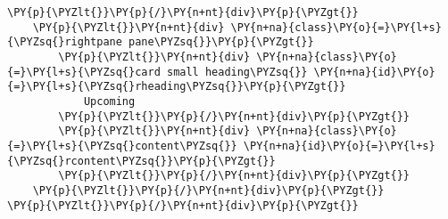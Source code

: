 \begin{Verbatim}[commandchars=\\\{\}]
    \PY{p}{\PYZlt{}}\PY{p}{/}\PY{n+nt}{div}\PY{p}{\PYZgt{}}
    \PY{p}{\PYZlt{}}\PY{n+nt}{div} \PY{n+na}{class}\PY{o}{=}\PY{l+s}{\PYZsq{}rightpane pane\PYZsq{}}\PY{p}{\PYZgt{}}
        \PY{p}{\PYZlt{}}\PY{n+nt}{div} \PY{n+na}{class}\PY{o}{=}\PY{l+s}{\PYZsq{}card small heading\PYZsq{}} \PY{n+na}{id}\PY{o}{=}\PY{l+s}{\PYZsq{}rheading\PYZsq{}}\PY{p}{\PYZgt{}}
            Upcoming
        \PY{p}{\PYZlt{}}\PY{p}{/}\PY{n+nt}{div}\PY{p}{\PYZgt{}}
        \PY{p}{\PYZlt{}}\PY{n+nt}{div} \PY{n+na}{class}\PY{o}{=}\PY{l+s}{\PYZsq{}content\PYZsq{}} \PY{n+na}{id}\PY{o}{=}\PY{l+s}{\PYZsq{}rcontent\PYZsq{}}\PY{p}{\PYZgt{}}
        \PY{p}{\PYZlt{}}\PY{p}{/}\PY{n+nt}{div}\PY{p}{\PYZgt{}}
    \PY{p}{\PYZlt{}}\PY{p}{/}\PY{n+nt}{div}\PY{p}{\PYZgt{}}
\PY{p}{\PYZlt{}}\PY{p}{/}\PY{n+nt}{div}\PY{p}{\PYZgt{}}
\end{Verbatim}
